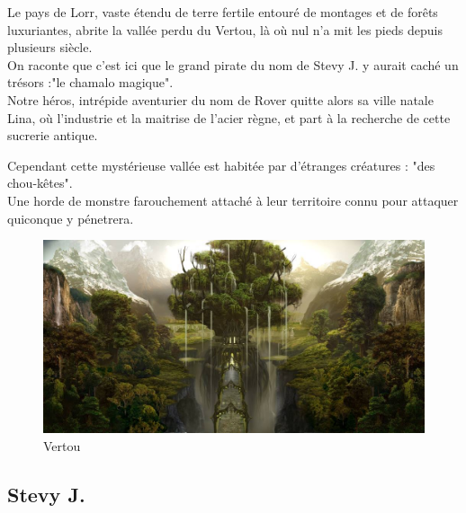 \documentclass[a4paper 12pts]{article}
\begin{document}
\vspace{1cm}

Le pays de Lorr, vaste étendu de terre fertile entouré de montages et de forêts luxuriantes, abrite la vallée perdu du Vertou, 
là où nul n'a mit les pieds depuis plusieurs siècle.\\
On raconte que c'est ici que le grand pirate du nom de Stevy J. y aurait caché un trésors :"le chamalo magique".\\
Notre héros, intrépide aventurier du nom de Rover quitte alors sa ville natale Lina, où l'industrie et la maitrise de l'acier règne,  et part à la recherche de cette sucrerie antique.\\

\newpage

Cependant  cette mystérieuse vallée est habitée par d'étranges créatures : "des chou-kêtes".\\
Une horde de monstre farouchement attaché à leur territoire connu pour attaquer quiconque y pénetrera.\\

\vspace{1cm}

\begin{figure}[h]
	\includegraphics[width=350pt]{Illustration/vertou.jpg}
	\caption{Vertou}
\end{figure}



\vspace{1cm}


\newpage
\subsection{Stevy J.}

\vspace{1cm}
\end{document}
